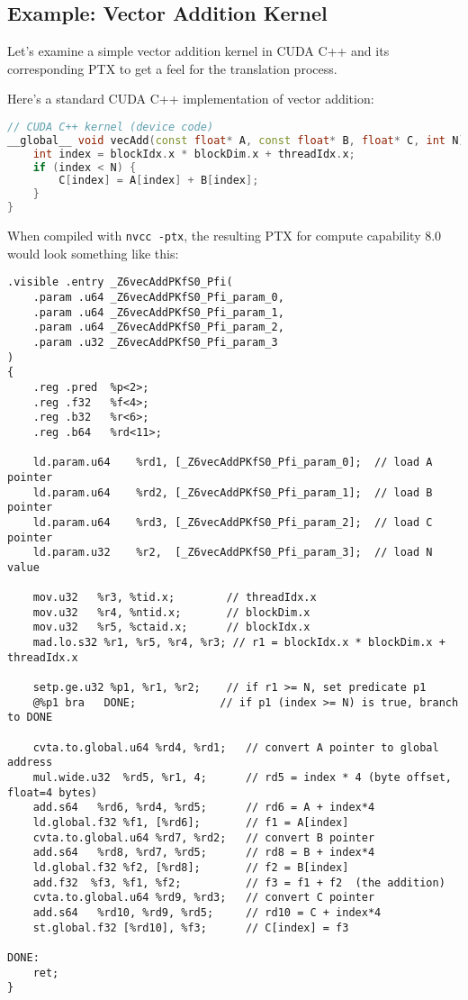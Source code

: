 \subsection{Example: Vector Addition Kernel}

Let's examine a simple vector addition kernel in CUDA C++ and its corresponding PTX to get a feel for the translation process.

Here's a standard CUDA C++ implementation of vector addition:

\begin{lstlisting}[language=C++]
// CUDA C++ kernel (device code)
__global__ void vecAdd(const float* A, const float* B, float* C, int N) {
    int index = blockIdx.x * blockDim.x + threadIdx.x;
    if (index < N) {
        C[index] = A[index] + B[index];
    }
}
\end{lstlisting}

When compiled with \texttt{nvcc -ptx}, the resulting PTX for compute capability 8.0 would look something like this:

\begin{lstlisting}[style=ptx]
.visible .entry _Z6vecAddPKfS0_Pfi(
    .param .u64 _Z6vecAddPKfS0_Pfi_param_0,
    .param .u64 _Z6vecAddPKfS0_Pfi_param_1,
    .param .u64 _Z6vecAddPKfS0_Pfi_param_2,
    .param .u32 _Z6vecAddPKfS0_Pfi_param_3
)
{
    .reg .pred  %p<2>;
    .reg .f32   %f<4>;
    .reg .b32   %r<6>;
    .reg .b64   %rd<11>;

    ld.param.u64    %rd1, [_Z6vecAddPKfS0_Pfi_param_0];  // load A pointer
    ld.param.u64    %rd2, [_Z6vecAddPKfS0_Pfi_param_1];  // load B pointer
    ld.param.u64    %rd3, [_Z6vecAddPKfS0_Pfi_param_2];  // load C pointer
    ld.param.u32    %r2,  [_Z6vecAddPKfS0_Pfi_param_3];  // load N value

    mov.u32   %r3, %tid.x;        // threadIdx.x
    mov.u32   %r4, %ntid.x;       // blockDim.x
    mov.u32   %r5, %ctaid.x;      // blockIdx.x
    mad.lo.s32 %r1, %r5, %r4, %r3; // r1 = blockIdx.x * blockDim.x + threadIdx.x

    setp.ge.u32 %p1, %r1, %r2;    // if r1 >= N, set predicate p1
    @%p1 bra   DONE;             // if p1 (index >= N) is true, branch to DONE

    cvta.to.global.u64 %rd4, %rd1;   // convert A pointer to global address
    mul.wide.u32  %rd5, %r1, 4;      // rd5 = index * 4 (byte offset, float=4 bytes)
    add.s64   %rd6, %rd4, %rd5;      // rd6 = A + index*4
    ld.global.f32 %f1, [%rd6];       // f1 = A[index]
    cvta.to.global.u64 %rd7, %rd2;   // convert B pointer
    add.s64   %rd8, %rd7, %rd5;      // rd8 = B + index*4
    ld.global.f32 %f2, [%rd8];       // f2 = B[index]
    add.f32  %f3, %f1, %f2;          // f3 = f1 + f2  (the addition)
    cvta.to.global.u64 %rd9, %rd3;   // convert C pointer
    add.s64   %rd10, %rd9, %rd5;     // rd10 = C + index*4
    st.global.f32 [%rd10], %f3;      // C[index] = f3

DONE:
    ret;
}
\end{lstlisting}

